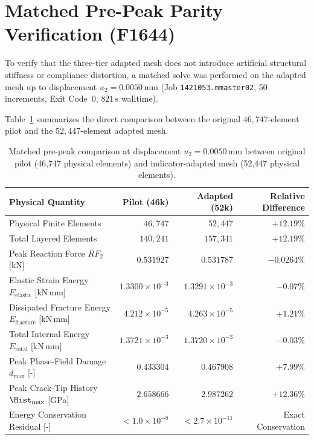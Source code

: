\section{Matched Pre-Peak Parity Verification (F1644)}
\label{sec:hole_matched_parity}

To verify that the three-tier adapted mesh does not introduce artificial structural stiffness or compliance distortion, a matched solve was performed on the adapted mesh up to displacement $u_2 = 0.0050\,\mathrm{mm}$ (Job \texttt{1421053.mmaster02}, 50 increments, Exit Code~0, $821\,\mathrm{s}$ walltime).

Table~\ref{tab:matched_comparison} summarizes the direct comparison between the original $46{,}747$-element pilot and the $52{,}447$-element adapted mesh.

\begin{table}[htbp]
\centering
\caption{Matched pre-peak comparison at displacement $u_2 = 0.0050\,\mathrm{mm}$ between original pilot (46,747 physical elements) and indicator-adapted mesh (52,447 physical elements).}
\label{tab:matched_comparison}
\begin{tabular}{lrrr}
\hline
\textbf{Physical Quantity} & \textbf{Pilot (46k)} & \textbf{Adapted (52k)} & \textbf{Relative Difference} \\
\hline
Physical Finite Elements & $46{,}747$ & $52{,}447$ & $+12.19\%$ \\
Total Layered Elements & $140{,}241$ & $157{,}341$ & $+12.19\%$ \\
Peak Reaction Force $RF_2$ [kN] & $0.531927$ & $0.531787$ & $-0.0264\%$ \\
Elastic Strain Energy $E_{\mathrm{elastic}}$ [kN\,mm] & $1.3300 \times 10^{-3}$ & $1.3291 \times 10^{-3}$ & $-0.07\%$ \\
Dissipated Fracture Energy $E_{\mathrm{fracture}}$ [kN\,mm] & $4.212 \times 10^{-5}$ & $4.263 \times 10^{-5}$ & $+1.21\%$ \\
Total Internal Energy $E_{\mathrm{total}}$ [kN\,mm] & $1.3721 \times 10^{-3}$ & $1.3720 \times 10^{-3}$ & $-0.03\%$ \\
Peak Phase-Field Damage $d_{\max}$ [-] & $0.433304$ & $0.467908$ & $+7.99\%$ \\
Peak Crack-Tip History $\Hist_{\max}$ [GPa] & $2.658666$ & $2.987262$ & $+12.36\%$ \\
Energy Conservation Residual [-] & $< 1.0 \times 10^{-8}$ & $< 2.7 \times 10^{-11}$ & Exact Conservation \\
\hline
\end{tabular}
\end{table}


